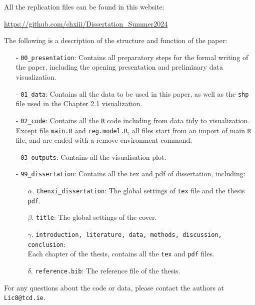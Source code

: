 All the replication files can be found in this website:

\url{https://github.com/chxiii/Dissertation_Summer2024}

\vspace{14pt}

The following is a description of the structure and function of the paper:

\begin{itemize}
    \item[-] \texttt{00\_presentation}: 
    Contains all preparatory steps for the formal writing of the paper, including the opening presentation and preliminary data visualization.
    \item[-] \texttt{01\_data}: 
    Contains all the data to be used in this paper, as well as the \texttt{shp} file used in the Chapter 2.1 visualization.
    \item[-] \texttt{02\_code}:
    Contains all the \texttt{R} code including from data tidy to visualization. Except file \texttt{main.R} and \texttt{reg.model.R}, all files start from an import of main \texttt{R} file, and are ended with a remove environment command.
    \item[-] \texttt{03\_outputs}: Contains all the visualisation plot.
    \item[-] \texttt{99\_dissertation}: Contains all the tex  and pdf of dissertation, including:
    \begin{itemize}
        \item [$\alpha$.] \texttt{Chenxi\_dissertation}: The global settings of \texttt{tex} file and the thesis \texttt{pdf}.
        \item [$\beta$.] \texttt{title}: The global settings of the cover.
        \item [$\gamma$.] \texttt{introduction, literature, data, methods, discussion, conclusion}: \\ Each chapter of the thesis, contains all the \texttt{tex} and \texttt{pdf} files.
        \item [$\delta$.] \texttt{reference.bib}: The reference file of the thesis.
    \end{itemize} 
\end{itemize}

For any questions about the code or data, please contact the authors at \texttt{Lic8@tcd.ie}.